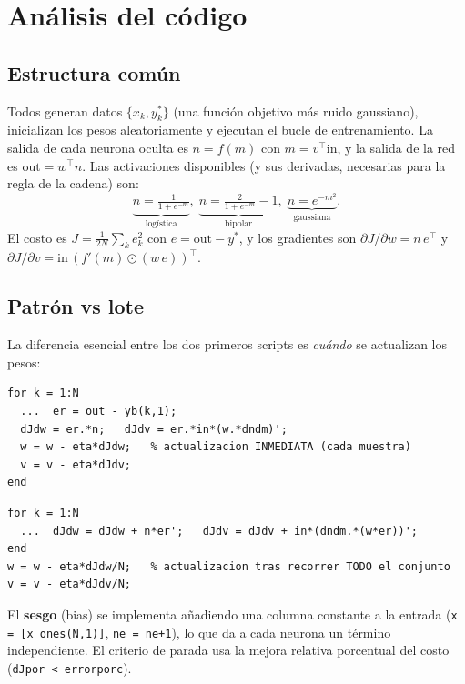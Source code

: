 \documentclass[11pt,a4paper]{article}
\newcommand{\code}[1]{\texttt{\small #1}}
\begin{document}
\section{Análisis del código}

\subsection{Estructura común}
Todos generan datos $\{x_k, y^*_k\}$ (una función objetivo más ruido gaussiano),
inicializan los pesos aleatoriamente y ejecutan el bucle de entrenamiento. La salida de
cada neurona oculta es $n=f(m)$ con $m=v^{\top}\text{in}$, y la salida de la red es
$\text{out}=w^{\top}n$. Las activaciones disponibles (y sus derivadas, necesarias para
la regla de la cadena) son:
\[
  \underbrace{n=\tfrac{1}{1+e^{-m}}}_{\text{logística}},\;
  \underbrace{n=\tfrac{2}{1+e^{-m}}-1}_{\text{bipolar}},\;
  \underbrace{n=e^{-m^2}}_{\text{gaussiana}}.
\]
El costo es $J=\tfrac{1}{2N}\sum_k e_k^2$ con $e=\text{out}-y^*$, y los gradientes son
$\partial J/\partial w = n\,e^{\top}$ y
$\partial J/\partial v = \text{in}\,(f'(m)\odot(w\,e))^{\top}$.

\subsection{Patrón vs lote}
La diferencia esencial entre los dos primeros scripts es \emph{cuándo} se actualizan los
pesos:

\begin{lstlisting}[caption={Entrenamiento PATRON: se actualiza dentro del bucle de muestras.}]
for k = 1:N
  ...  er = out - yb(k,1);
  dJdw = er.*n;   dJdv = er.*in*(w.*dndm)';
  w = w - eta*dJdw;   % actualizacion INMEDIATA (cada muestra)
  v = v - eta*dJdv;
end
\end{lstlisting}

\begin{lstlisting}[caption={Entrenamiento LOTE: se acumula y se actualiza una vez por epoca.}]
for k = 1:N
  ...  dJdw = dJdw + n*er';   dJdv = dJdv + in*(dndm.*(w*er))';
end
w = w - eta*dJdw/N;   % actualizacion tras recorrer TODO el conjunto
v = v - eta*dJdv/N;
\end{lstlisting}

El \textbf{sesgo} (bias) se implementa añadiendo una columna constante a la entrada
(\code{x = [x ones(N,1)]}, \code{ne = ne+1}), lo que da a cada neurona un término
independiente. El criterio de parada usa la mejora relativa porcentual del costo
(\code{dJpor < errorporc}).
\end{document}
